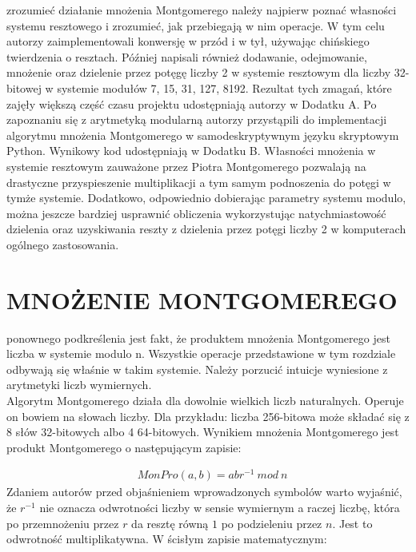 \documentclass[10pt,journal,compsoc]{IEEEtran}
\begin{document}
 zrozumieć działanie mnożenia Montgomerego należy najpierw poznać własności systemu resztowego i zrozumieć, jak przebiegają w nim operacje. W tym celu autorzy zaimplementowali konwersję w przód i w tył, używając chińskiego twierdzenia o resztach. Później napisali również dodawanie, odejmowanie, mnożenie oraz dzielenie przez potęgę liczby 2 w systemie resztowym dla liczby 32-bitowej w systemie modułów 7, 15, 31, 127, 8192. Rezultat tych zmagań, które zajęły większą część czasu projektu udostępniają autorzy w Dodatku A. Po zapoznaniu się z arytmetyką modularną autorzy przystąpili do implementacji algorytmu mnożenia Montgomerego w samodeskryptywnym języku skryptowym Python. Wynikowy kod udostępniają w Dodatku B. Własności mnożenia w systemie resztowym zauważone przez Piotra Montgomerego pozwalają na drastyczne przyspieszenie multiplikacji a tym samym podnoszenia do potęgi w tymże systemie. Dodatkowo, odpowiednio dobierając parametry systemu modulo, można jeszcze bardziej usprawnić obliczenia wykorzystując natychmiastowość dzielenia oraz uzyskiwania reszty z dzielenia przez potęgi liczby 2 w komputerach ogólnego zastosowania.

\section{MNOŻENIE MONTGOMEREGO}
 ponownego podkreślenia jest fakt, że produktem mnożenia Montgomerego jest liczba w systemie modulo n. Wszystkie operacje przedstawione w tym rozdziale odbywają się właśnie w takim systemie. Należy porzucić intuicje wyniesione z arytmetyki liczb wymiernych.\\
Algorytm Montgomerego działa dla dowolnie wielkich liczb naturalnych. Operuje on bowiem na słowach liczby. Dla przykładu: liczba 256-bitowa może składać się z 8 słów 32-bitowych albo 4 64-bitowych. Wynikiem mnożenia Montgomerego jest produkt Montgomerego o następującym zapisie:

\begin{align*}
  &MonPro(a,b) = abr^{-1}\ mod\ n
\end{align*}
\noindent
Zdaniem autorów przed objaśnieniem wprowadzonych symbolów warto wyjaśnić, że $r^{-1}$ nie oznacza odwrotności liczby w sensie wymiernym a raczej liczbę, która po przemnożeniu przez $r$ da resztę równą $1$ po podzieleniu przez $n$. Jest to odwrotność multiplikatywna. W ścisłym zapisie matematycznym:
\end{document}

